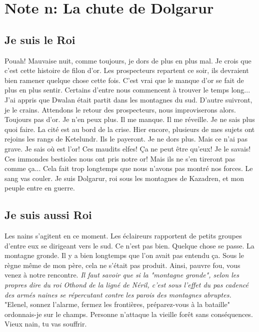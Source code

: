 \section{Note n: La chute de Dolgarur}
\subsection{Je suis le Roi}
Pouah! Mauvaise nuit, comme toujours, je dors de plus en plus mal. Je crois que c'est cette histoire de filon d'or. Les prospecteurs repartent ce soir, ils devraient bien ramener quelque chose cette fois. C'est vrai que le manque d'or se fait de plus en plus sentir. Certains d’entre nous commencent à trouver le temps long... J'ai appris que Dwalan était partit dans les montagnes du sud. D'autre suivront, je le crains. Attendons le retour des prospecteurs, nous improviserons alors.
\newline
Toujours pas d'or. Je n'en peux plus. Il me manque. Il me réveille. Je ne sais plus quoi faire. La cité est au bord de la crise. Hier encore, plusieurs de mes sujets ont rejoins les rangs de Ketelundr. Ils le payeront.
\newline
Je ne dors plus. Mais ce n'ai pas grave. Je sais où est l'or! Ces maudits elfes! Ça ne peut être qu'eux! Je le savais! Ces immondes bestioles nous ont pris notre or! Mais ils ne s'en tireront pas comme ça... Cela fait trop longtemps que nous n'avons pas montré nos forces. Le sang vas couler. Je suis Dolgarur, roi sous les montagnes de Kazadren, et mon peuple entre en guerre.

\subsection{Je suis aussi Roi}
Les nains s'agitent en ce moment. Les éclaireurs rapportent de petits groupes d'entre eux se dirigeant vers le sud. Ce n'est pas bien. Quelque chose se passe.
\newline
La montagne gronde. Il y a bien longtemps que l'on avait pas entendu ça. Sous le règne même de mon père, cela ne s'était pas produit. Ainsi, pauvre fou, vous venez à notre rencontre.
\textit{Il faut savoir que si la "montagne gronde", selon les propres dire du roi Othond de la ligné de Néril, c'est sous l'effet du pas cadencé des armés naines se répercutant contre les parois des montagnes abruptes.} "Elenel, sonnez l'alarme, fermez les frontières, préparez-vous à la bataille" ordonnais-je sur le champs. Personne n'attaque la vieille forêt sans conséquences. Vieux nain, tu vas souffrir.


